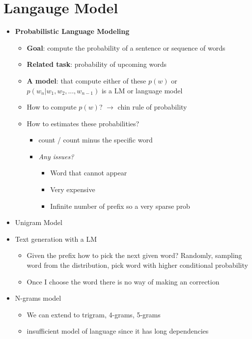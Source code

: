 \chapter{Langauge Model}
\begin{itemize}
    \item \textbf{Probabilistic Language Modeling}
    \begin{itemize}
        \item \textbf{Goal}: compute the probability of a sentence or sequence of words 
        \item \textbf{Related task}: probability of upcoming words
        \item \textbf{A model}: that compute either of these \(p(w)\) or \(p(w_n | w_1, w_2, ..., w_{n-1})\) is a LM or language model
        \item How to compute \(p(w)\)? \(\rightarrow\) chin rule of probability
        \item How to estimates these probabilities?
        \begin{itemize}
            \item count / count minus the specific word
            \item \textit{Any issues?} 
            \begin{itemize}
                \item Word that cannot appear
                \item Very expensive
                \item Infinite number of prefix so a very sparse prob
            \end{itemize}
        \end{itemize}
    \end{itemize}
    \item Unigram Model
    \item Text generation with a LM
    \begin{itemize}
        \item Given the prefix how to pick the next given word? Randomly, sampling word from the distribution, pick word with higher conditional probability
        \item Once I choose the word there is no way of making an correction
    \end{itemize}
    \item N-grams model
    \begin{itemize}
        \item We can extend to trigram, 4-grams, 5-grams
        \item insufficient model of language since it has long dependencies

\end{itemize}
\end{itemize}
